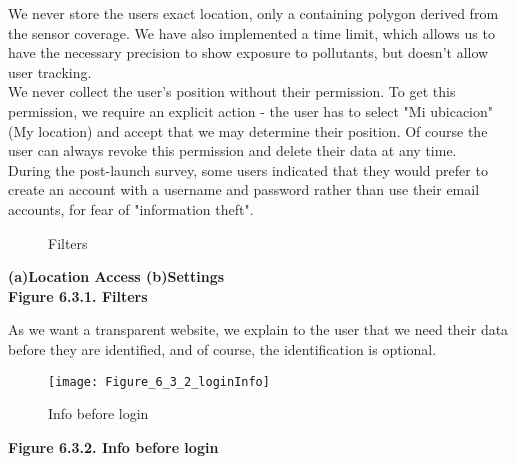 We never store the users exact location, only a containing polygon derived from the sensor coverage.
We have also implemented a time limit, which allows us to have the necessary precision to show exposure to pollutants, but doesn't allow user tracking.\\

We never collect the user's position without their permission.
To get this permission, we require an explicit action - the user has to select "Mi ubicacion" (My location) and accept that we may determine their position.
Of course the user can always revoke this permission and delete their data at any time. \\

During the post-launch survey, some users indicated that they would prefer to create an account with a username and password rather than use their email accounts, for fear of "information theft".\\

\begin{figure}[ht]
    \centering
    \hfill
    \caption{Filters}
\end{figure}

\begin{center}
    \bf{ (a)Location Access (b)Settings\\

    Figure 6.3.1. Filters}
  \end{center} 


As we want a transparent website, we explain to the user that we need their data before
they are identified, and of course, the identification is optional. \\

\begin{figure}[ht]
    \centering
    \texttt{[image: Figure\_6\_3\_2\_loginInfo]}
    \caption{Info before login}
\end{figure}
\begin{center}
    \bf{ 
    Figure 6.3.2. Info before login}
  \end{center} 